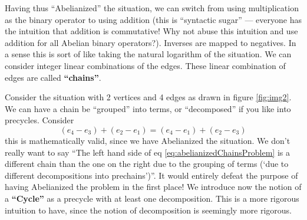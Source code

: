 
Having thus ``Abelianized'' the situation, we can switch from
using multiplication as the binary operator to using addition
(this is ``syntactic sugar'' --- everyone has the intuition that
addition is commutative! Why not abuse this intuition and use
addition for all Abelian binary operators?). Inverses are mapped
to negatives. In a sense this is sort of like taking the natural
logarithm of the situation. We can consider integer linear
combinations of the edges. These linear combination of edges are
called \textbf{``chains''}.


Consider the situation with 2 vertices and 4 edges %
as drawn in figure \ref{fig:img2}. We can have a
chain be ``grouped'' into terms, or ``decomposed'' if you like
into precycles. Consider
\begin{equation}\label{eq:abelianizedChainsProblem}
(e_{4}-e_{3})+(e_{2}-e_{1})=(e_{4}-e_{1})+(e_{2}-e_{3})
\end{equation}
this is mathematically valid, since we have Abelianized the
situation. We don't really want to say ``The left hand side of eq
\eqref{eq:abelianizedChainsProblem} is a different chain than the
one on the right due to the grouping of terms (`due to different
decompositions into prechains')''. It would entirely defeat the
purpose of having Abelianized the problem in the first place! We
introduce now the notion of a \textbf{``Cycle''} as a precycle
with at least one decomposition. This is a more rigorous
intuition to have, since the notion of decomposition is seemingly
more rigorous.

